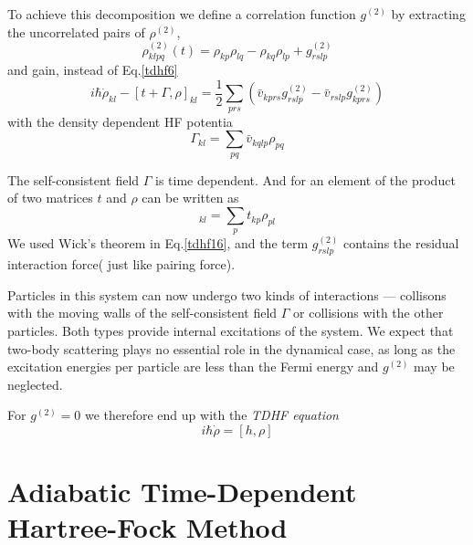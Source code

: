   To achieve this decomposition we define a correlation function $g^{(2)}$ by extracting the uncorrelated pairs of $\rho^{(2)}$,
  \begin{equation}
    \rho_{klpq}^{(2)}(t) = \rho_{kp}\rho_{lq} - \rho_{kq}\rho_{lp} + g_{rslp}^{(2)} \label{tdhf16}
  \end{equation}
  and gain, instead of Eq.\eqref{tdhf6}
  \begin{equation}
    i\hbar\dot{\rho}_{kl} - [t+\Gamma, \rho]_{kl} = \frac{1}{2}\sum_{prs} \left(\bar{v}_{kprs}g_{rslp}^{(2)} - \bar{v}_{rslp}g_{kprs}^{(2)}\right) \label{tdhf17}
  \end{equation}
  with the density dependent HF potentia
  \begin{equation}
    \Gamma_{kl} = \sum_{pq}\bar{v}_{kqlp}\rho_{pq}  \label{tdhf18}
  \end{equation}

  \begin{note}
    The self-consistent field $\Gamma$ is time dependent. And for an element of the product of two matrices $t$ and $\rho$ can be written as
    \begin{equation}
      [t\rho]_{kl} = \sum_{p}t_{kp}\rho_{pl}  \label{tdhf19}
    \end{equation}
    We used Wick's theorem in Eq.\eqref{tdhf16}, and the term $g_{rslp}^{(2)}$ contains the residual interaction force( just like pairing force).
  \end{note}

  Particles in this system can now undergo two kinds of interactions --- collisons with the moving walls of the self-consistent field $\Gamma$ or collisions with the other particles. Both types provide internal excitations of the system. We expect that two-body scattering plays no essential role in the dynamical case, as long as the excitation energies per particle are less than the Fermi energy and $g^{(2)}$ may be neglected. 
  
  For $g^{(2)}=0$ we therefore end up with the \textit{TDHF equation}
  \begin{equation}
    i\hbar\dot{\rho} = [h,\rho] \label{tdhf20}
  \end{equation} 


  \section{Adiabatic Time-Dependent Hartree-Fock Method}

